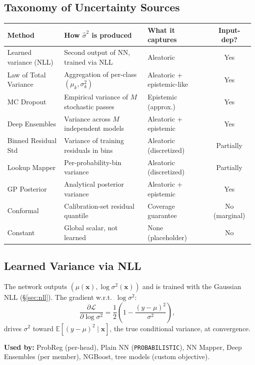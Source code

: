 \documentclass[11pt,a4paper]{article}
\theoremstyle{definition}
\newcommand{\E}{\mathbb{E}}
\newcommand{\bx}{\mathbf{x}}
\begin{document}
\subsection{Taxonomy of Uncertainty Sources}

\begin{center}
\renewcommand{\arraystretch}{1.3}
\begin{tabular}{lp{4.2cm}p{4.2cm}c}
\toprule
\textbf{Method} & \textbf{How $\hat{\sigma}^2$ is produced} & \textbf{What it captures} & \textbf{Input-dep?} \\
\midrule
Learned variance (NLL) & Second output of NN, trained via NLL & Aleatoric & Yes \\
Law of Total Variance & Aggregation of per-class $(\mu_k, \sigma_k^2)$ & Aleatoric + epistemic-like & Yes \\
MC Dropout & Empirical variance of $M$ stochastic passes & Epistemic (approx.) & Yes \\
Deep Ensembles & Variance across $M$ independent models & Aleatoric + epistemic & Yes \\
Binned Residual Std & Variance of training residuals in bins & Aleatoric (discretized) & Partially \\
Lookup Mapper & Per-probability-bin variance & Aleatoric (discretized) & Partially \\
GP Posterior & Analytical posterior variance & Aleatoric + epistemic & Yes \\
Conformal & Calibration-set residual quantile & Coverage guarantee & No (marginal) \\
Constant & Global scalar, not learned & None (placeholder) & No \\
\bottomrule
\end{tabular}
\end{center}

\subsection{Learned Variance via NLL}
\label{sec:uq_nll}

The network outputs $(\mu(\bx), \log\sigma^2(\bx))$ and is trained with
the Gaussian NLL (\S\ref{sec:nll}). The gradient w.r.t.\ $\log\sigma^2$:
\[
  \frac{\partial \mathcal{L}}{\partial \log\sigma^2} = \frac{1}{2}\left(1 - \frac{(y - \mu)^2}{\sigma^2}\right),
\]
drives $\sigma^2$ toward $\E[(y - \mu)^2 \mid \bx]$, the true conditional
variance, at convergence.

\textbf{Used by:} ProbReg (per-head), Plain NN (\texttt{PROBABILISTIC}),
NN Mapper, Deep Ensembles (per member), NGBoost, tree models (custom objective).
\end{document}
